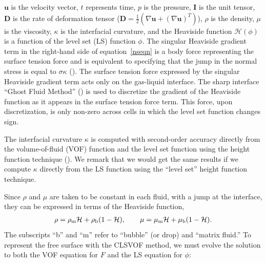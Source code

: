 \documentclass{elsarticle}
\newcommand{\Hea}{\mathcal{H}}
\newcommand{\vv}{\mathbf}
\newcommand{\bmD}{\vv{D}}
\newcommand{\bmg}{\vv{g}}
\newcommand{\bmI}{\vv{I}}
\newcommand{\bmu}{\vv{u}}
\begin{document}
%
%
\par
$\bmu$ is the velocity vector, $t$ represents time, $p$ is the pressure, $\bmI$ is the unit tensor, $\bmD$ is the rate of deformation tensor ($\bmD=\frac{1}{2}(\nabla\bmu+(\nabla\bmu)^{T})$), $\rho$ is the density, $\mu$ is the viscosity, $\kappa$ is the interfacial curvature, and the Heaviside function $\Hea(\phi)$ is a function of the level set (LS) function $\phi$. The singular Heaviside gradient term in the right-hand side of equation~\eqref{nseqn} is a body force representing the surface tension force and is equivalent to specifying that the jump in the normal stress is equal to $\sigma\kappa$ (\citet{TanguyEtAl2007}).  The surface tension force expressed by the singular Heaviside gradient term acts only on the gas-liquid interface.  The sharp interface ``Ghost Fluid Method'' (\citet{KanFedLiu00}) is used to discretize the gradient of the Heaviside function as it appears in the surface tension force term.  This force, upon discretization, is only non-zero across cells in which the level set function changes sign.
\par
The interfacial curvature $\kappa$ is computed with second-order accuracy directly from the volume-of-fluid (VOF) function and the level set function using the height function technique (\citet{Sus03,SusSmiHusOhtZhi07}).  We remark that we would get the same results if we compute $\kappa$ directly from the LS function using the ``level set'' height function technique.
\par
Since $\rho$ and $\mu$ are taken to be constant in each fluid, with a jump at
the interface, they can be expressed in terms of the Heaviside function,
%
\begin{eqnarray}\label{rhomu}
  \rho=\rho_{\rm m}\Hea+\rho_{\rm b}(1-\Hea), \qquad 
  \mu=\mu_{\rm m}\Hea+\mu_{\rm b}(1-\Hea).
\end{eqnarray}
%
The subscripts ``b'' and ``m'' refer to ``bubble'' (or drop) and ``matrix fluid.'' To represent the free surface with the CLSVOF method, we must evolve the solution to both the VOF equation for $F$ and the LS equation for $\phi$:
\end{document}
